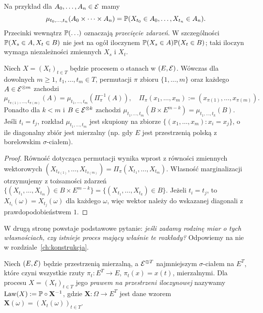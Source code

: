 Na przykład dla $A_0,\ldots,A_n\in\mathcal{E}$ mamy
\[
\mu_{t_0,\ldots,t_n}(A_0\times\cdots\times A_n)
=\mathbb{P}(X_{t_0}\in A_0,\ldots,X_{t_n}\in A_n).
\]
Przecinki wewnątrz $\mathbb{P}(\ldots)$ oznaczają \emph{przecięcie zdarzeń}.
W szczególności $\mathbb{P}(X_s\in A,X_t\in B)$ nie jest na ogół
iloczynem $\mathbb{P}(X_s\in A)\mathbb{P}(X_t\in B)$; taki iloczyn
wymaga niezależności zmiennych $X_s$ i $X_t$.

\begin{twierdzenie}
Niech $X=(X_t)_{t\in T}$ będzie procesem o stanach w $(E,\mathcal{E})$.
Wówczas dla dowolnych $m\ge1$, $t_1,\ldots,t_m\in T$,
permutacji $\pi$ zbioru $\{1,\ldots,m\}$ oraz każdego
$A\in\mathcal{E}^{\otimes m}$ zachodzi
\[
\mu_{t_{\pi(1)},\ldots,t_{\pi(m)}}(A)
=\mu_{t_1,\ldots,t_m}(\Pi_\pi^{-1}(A)),
\quad
\Pi_\pi(x_1,\ldots,x_m):=(x_{\pi(1)},\ldots,x_{\pi(m)}).
\]
Ponadto dla $k<m$ i $B\in\mathcal{E}^{\otimes k}$ zachodzi
$\mu_{t_1,\ldots,t_m}(B\times E^{m-k})=\mu_{t_1,\ldots,t_k}(B)$.
Jeśli $t_i=t_j$, rozkład $\mu_{t_1,\ldots,t_m}$ jest skupiony na
zbiorze $\{(x_1,\ldots,x_m):x_i=x_j\}$, o ile diagonalny zbiór jest mierzalny
(np. gdy $E$ jest przestrzenią polską z borelowskim $\sigma$-ciałem).
\end{twierdzenie}
\begin{proof}
Równość dotycząca permutacji wynika wprost z równości zmiennych
wektorowych
$(X_{t_{\pi(1)}},\ldots,X_{t_{\pi(m)}})
=\Pi_\pi(X_{t_1},\ldots,X_{t_m})$.
Własność marginalizacji otrzymujemy z tożsamości zdarzeń
$\{(X_{t_1},\ldots,X_{t_m})\in B\times E^{m-k}\}
=\{(X_{t_1},\ldots,X_{t_k})\in B\}$.
Jeżeli $t_i=t_j$, to $X_{t_i}(\omega)=X_{t_j}(\omega)$
dla każdego $\omega$, więc wektor należy do wskazanej diagonali
z prawdopodobieństwem $1$.
\end{proof}

W drugą stronę powstaje podstawowe pytanie: \emph{jeśli zadamy
rodzinę miar o tych własnościach, czy istnieje proces mający właśnie
te rozkłady?} Odpowiemy na nie w rozdziale~\ref{ch:konstrukcja}.

\begin{definicja}
Niech $(E,\mathcal{E})$ będzie przestrzenią mierzalną, a
$\mathcal{E}^{\otimes T}$ najmniejszym $\sigma$-ciałem na $E^T$,
które czyni wszystkie rzuty $\pi_t:E^T\to E$, $\pi_t(x)=x(t)$,
mierzalnymi. Dla procesu $X=(X_t)_{t\in T}$ jego
\emph{prawem na przestrzeni iloczynowej} nazywamy
$\operatorname{Law}(X):=\mathbb{P}\circ\mathbf X^{-1}$, gdzie
$\mathbf X:\Omega\to E^T$ jest dane wzorem
$\mathbf X(\omega)=(X_t(\omega))_{t\in T}$.
\end{definicja}

